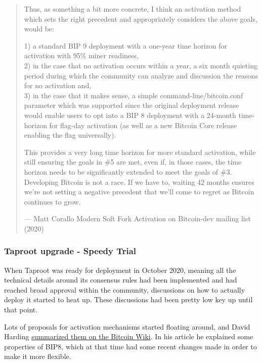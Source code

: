\begin{quote}
Thus, as something a bit more concrete, I think an activation method
which sets the right precedent and appropriately considers the above
goals, would be:

1) a standard BIP 9 deployment with a one-year time horizon for
activation with 95\% miner readiness,\\
2) in the case that no activation occurs within a year, a six month
quieting period during which the community can analyze and discussion
the reasons for no activation and,\\
3) in the case that it makes sense, a simple command-line/bitcoin.conf
parameter which was supported since the original deployment release
would enable users to opt into a BIP 8 deployment with a 24-month
time-horizon for flag-day activation (as well as a new Bitcoin Core
release enabling the flag universally).

This provides a very long time horizon for more standard activation,
while still ensuring the goals in \#5 are met, even if, in those cases,
the time horizon needs to be significantly extended to meet the goals of
\#3. Developing Bitcoin is not a race. If we have to, waiting 42 months
ensures we're not setting a negative precedent that we'll come to regret
as Bitcoin continues to grow.

---  Matt Corallo Modern Soft Fork Activation on Bitcoin-dev mailing
list (2020)
\end{quote}

\hypertarget{taproot-deployment}{%
\subsubsection{Taproot upgrade - Speedy
Trial}\label{taproot-deployment}}

When Taproot was ready for deployment in October 2020, meaning all the
technical details around its consensus rules had been implemented and
had reached broad approval within the community, discussions on how to
actually deploy it started to heat up. These discussions had been pretty
low key up until that point.

Lots of proposals for activation mechanisms started floating around, and
David Harding
\href{https://en.bitcoin.it/wiki/Taproot_activation_proposals}{summarized
them on the Bitcoin Wiki}. In his article he explained some properties
of BIP8, which at that time had some recent changes made in order to
make it more flexible.

